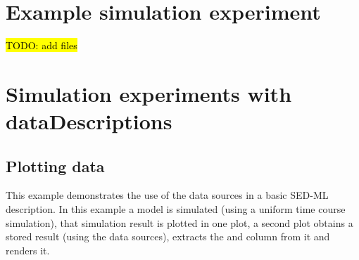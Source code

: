 \section{Example simulation experiment}
\hl{TODO: add files}

%
%
%
%
%
%

\section{Simulation experiments with dataDescriptions}

\subsection{Plotting data}
This example demonstrates the use of the data sources in a basic SED-ML description. In this example a model is simulated (using a uniform time course simulation), that simulation result is plotted in one plot, a second plot obtains a stored result (using the data sources), extracts the  and  column from it and renders it.

